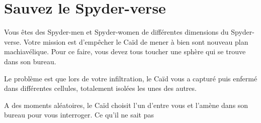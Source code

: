 \documentclass[a4paper,10pt,oneside]{article}
\begin{document}
\section{Sauvez le Spyder-verse}

Vous êtes des Spyder-men et Spyder-women de différentes dimensions du Spyder-verse.
Votre mission est d'empêcher le Caïd de mener à bien sont nouveau plan machiavélique.
Pour ce faire, vous devez tous toucher une sphère qui se trouve dans son bureau.

Le problème est que lors de votre infiltration, le Caïd vous a capturé puis enfermé dans différentes cellules, totalement isolées les unes des autres.

A des moments aléatoires, le Caïd choisit l'un d'entre vous et l'amène dans son bureau pour vous interroger.
Ce qu'il ne sait pas 

\newpage
  

\end{document}
